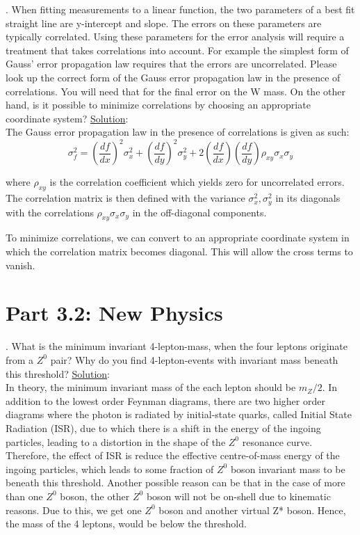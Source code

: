 \documentclass[a4paper]{report}
\numberwithin{equation}{section}
\begin{document}
.  When fitting measurements to a linear function, the two parameters of a best fit straight line are y-intercept and slope. The errors on these parameters are typically correlated. Using these parameters for the error analysis will require a treatment that takes correlations into account. For example the simplest form of Gauss’ error propagation law requires that the errors are uncorrelated. Please look up the correct form of the Gauss error propagation law in the presence of correlations. You will need that for the final error on the W mass. On the other hand, is it possible to minimize correlations by choosing an appropriate coordinate system?
\bigbreak
\noindent \underline{Solution}: \\
\noindent The Gauss error propagation law in the presence of correlations is given as such:
$$
	\sigma_f ^2 = \left( \frac{df}{dx} \right)^2 \sigma_x^2 + \left( \frac{df}{dy} \right)^2 \sigma_y^2 + 2 \left( \frac{df}{dx} \right) \left( \frac{df}{dy} \right) \rho_{xy} \sigma_{x} \sigma_y $$
	
\noindent where $\rho_{xy}$ is the correlation coefficient which yields zero for uncorrelated errors. The correlation matrix is then defined with the variance $\sigma_x^2, \sigma_y^2$ in its diagonals with the correlations $\rho_{xy} \sigma_x \sigma_y$ in the off-diagonal components.

\noindent To minimize correlations, we can convert to an appropriate coordinate system in which the correlation matrix becomes diagonal. This will allow the cross terms to vanish.

\section{Part 3.2: New Physics}

. What is the minimum invariant 4-lepton-mass, when the four leptons originate from a $Z^0$ pair? Why do you find 4-lepton-events with invariant mass beneath this threshold?
\bigbreak
\noindent \underline{Solution}: \\
\noindent In theory, the minimum invariant mass of the each lepton should be $m_Z / 2$. In addition to the lowest order Feynman diagrams, there are two higher order diagrams where the photon is radiated by initial-state quarks, called Initial State Radiation (ISR), due to which there is a shift in the energy of the ingoing particles, leading to a distortion in the shape of the $Z^0$ resonance curve. Therefore, the effect of ISR is reduce the effective centre-of-mass energy of the ingoing particles, which leads to some fraction of $Z^0$ boson invariant mass to be beneath this threshold. 
Another possible reason can be that in the case of more than one $Z^0$ boson, the other $Z^0$ boson will not be on-shell due to kinematic reasons. Due to this, we get one $Z^0$ boson and another virtual Z* boson. Hence, the mass of the 4 leptons, would be below the threshold. 
\end{document}
